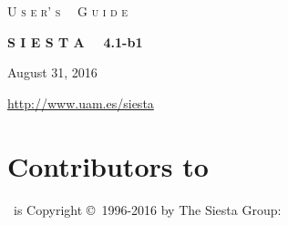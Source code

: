 \begin{titlepage}

\begin{center}

\vspace{1cm}
{\Huge \textsc{U s e r' s \, \, G u i d e}}

\vspace{1cm}
\hrulefill
\vspace{1cm}

{\Huge \textbf{S I E S T A \, \, 4.1-b1}}

\vspace{1cm}
\hrulefill
\vspace{0.5cm}

{\Large August 31, 2016 }

\vspace{1.5cm}
{\Large \url{http://www.uam.es/siesta}}

\end{center}

\end{titlepage}


\newpage


\section*{Contributors to \siesta}

\siesta\ is Copyright \copyright\  1996-2016 by The Siesta Group:
\vspace{0.5cm}

